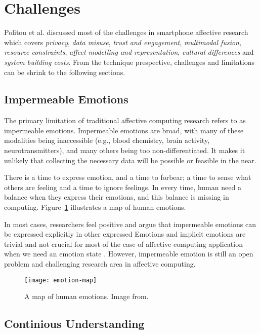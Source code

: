 \section{Challenges}\label{sec:challenges}

Politou et al. \cite{Politou2017} discussed most of the challenges in smartphone affective research which covers \emph{privacy}, \emph{data misuse}, \emph{trust and engagement}, \emph{multimodal fusion}, \emph{resource constraints}, \emph{affect modelling and representation}, \emph{cultural differences} and \emph{system building costs}. From the technique prespective, challenges and limitations can be shrink to the following sections.

\subsection{Impermeable Emotions}

The primary limitation of traditional affective computing research refers to as impermeable emotions\cite{picard2003affective}. Impermeable emotions are broad, with many of these modalities being inaccessible (e.g., blood chemistry, brain activity, neurotransmitters), and many others being too non-differentiated. It makes it unlikely that collecting the necessary data will be possible or feasible in the near. 

There is a time to express emotion, and a time to forbear; a time to sense what others are feeling and a time to ignore feelings. In every time, human need a balance when they express their emotions, and this balance is missing in computing. Figure~\ref{fig:emotions} illustrates a map of human emotions.

In most cases, researchers feel positive and argue that impermeable emotions can be expressed explicitly in other expressed Emotions\cite{parkinson1995ideas} and implicit emotions are trivial and not crucial for most of the case of affective computing application when we need an emotion state \cite{Zhang2014}. However, impermeable emotion is still an open problem and challenging research area in affective computing.

\begin{figure}[htb]
    \centering
    \texttt{[image: emotion-map]}
    \caption{A map of human emotions. Image from\cite{emotionmap}.}
    \label{fig:emotions}
\end{figure}


\subsection{Continious Understanding}

